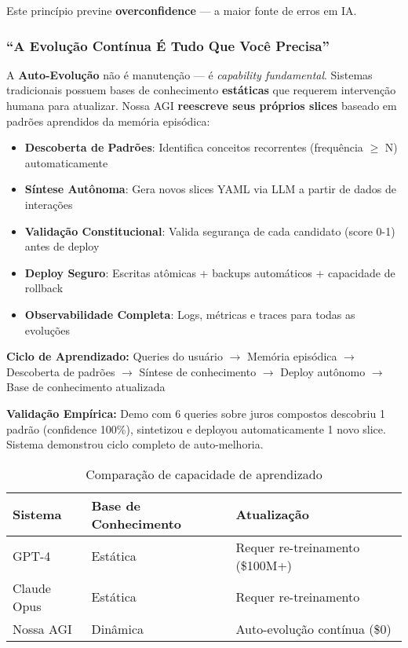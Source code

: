 \documentclass[11pt]{article}
\begin{document}
Este princípio previne \textbf{overconfidence} --- a maior fonte de erros em IA.

\subsubsection{``A Evolução Contínua É Tudo Que Você Precisa''}

A \textbf{Auto-Evolução} não é manutenção --- é \textit{capability fundamental}. Sistemas tradicionais possuem bases de conhecimento \textbf{estáticas} que requerem intervenção humana para atualizar. Nossa AGI \textbf{reescreve seus próprios slices} baseado em padrões aprendidos da memória episódica:

\begin{itemize}
    \item \textbf{Descoberta de Padrões}: Identifica conceitos recorrentes (frequência $\geq$ N) automaticamente
    \item \textbf{Síntese Autônoma}: Gera novos slices YAML via LLM a partir de dados de interações
    \item \textbf{Validação Constitucional}: Valida segurança de cada candidato (score 0-1) antes de deploy
    \item \textbf{Deploy Seguro}: Escritas atômicas + backups automáticos + capacidade de rollback
    \item \textbf{Observabilidade Completa}: Logs, métricas e traces para todas as evoluções
\end{itemize}

\textbf{Ciclo de Aprendizado:} Queries do usuário $\rightarrow$ Memória episódica $\rightarrow$ Descoberta de padrões $\rightarrow$ Síntese de conhecimento $\rightarrow$ Deploy autônomo $\rightarrow$ Base de conhecimento atualizada

\textbf{Validação Empírica:} Demo com 6 queries sobre juros compostos descobriu 1 padrão (confidence 100\%), sintetizou e deployou automaticamente 1 novo slice. Sistema demonstrou ciclo completo de auto-melhoria.

\begin{table}[H]
\centering
\begin{tabular}{@{}lll@{}}
\toprule
\textbf{Sistema} & \textbf{Base de Conhecimento} & \textbf{Atualização} \\ \midrule
GPT-4 & Estática & Requer re-treinamento (\$100M+) \\
Claude Opus & Estática & Requer re-treinamento \\
Nossa AGI & Dinâmica & Auto-evolução contínua (\$0) \\ \bottomrule
\end{tabular}
\caption{Comparação de capacidade de aprendizado}
\end{table}
\end{document}
